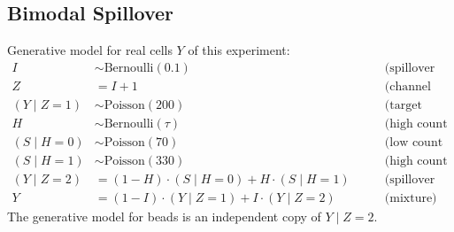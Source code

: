 \documentclass[
]{article}
\begin{document}
\subsection*{Bimodal Spillover}\label{bimodal-spillover}

Generative model for real cells \(Y\) of this experiment:
\[
\begin{aligned}
I               & \sim \text{Bernoulli}(0.1)                            & \qquad \text{(spillover indictor)} \\
Z               & = I + 1                                               & \qquad \text{(channel number)} \\
(Y \mid Z = 1)  & \sim \text{Poisson}(200)                              & \qquad \text{(target component)} \\
H               & \sim \text{Bernoulli}(\tau)                           & \qquad \text{(high count indicator)} \\
(S \mid H = 0)  & \sim \text{Poisson}(70)                               & \qquad \text{(low count component)} \\
(S \mid H = 1)  & \sim \text{Poisson}(330)                              & \qquad \text{(high count component)} \\
( Y \mid Z = 2) & = (1-H) \cdot (S \mid H = 0) + H \cdot (S \mid H = 1) & \qquad \text{(spillover component)} \\
Y               & = (1-I) \cdot (Y \mid Z = 1) + I \cdot (Y \mid Z = 2) & \qquad \text{(mixture)}
\end{aligned}
\]
The generative model for beads is an independent copy of \(Y \mid Z = 2\).
\end{document}
